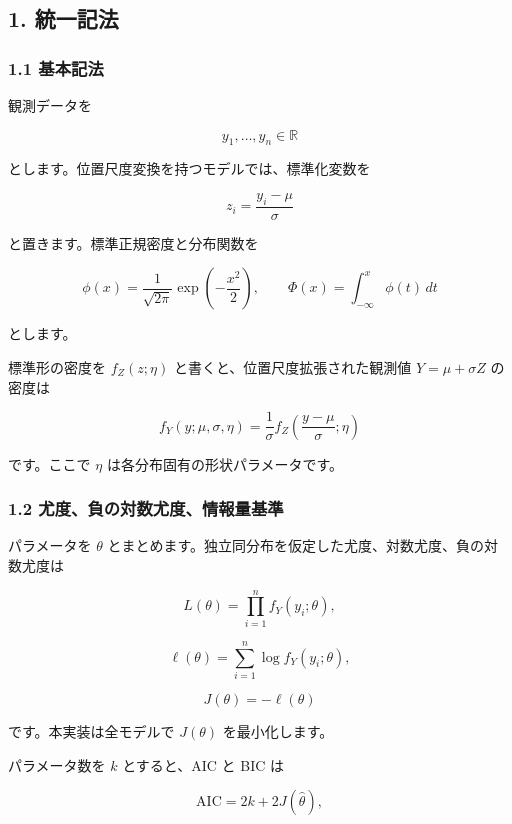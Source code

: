 \documentclass[
]{article}
\begin{document}
\hypertarget{ux7d71ux4e00ux8a18ux6cd5}{%
\subsection{1. 統一記法}\label{ux7d71ux4e00ux8a18ux6cd5}}

\hypertarget{ux57faux672cux8a18ux6cd5}{%
\subsubsection{1.1 基本記法}\label{ux57faux672cux8a18ux6cd5}}

観測データを

\[
y_1,\ldots,y_n \in \mathbb{R}
\]

とします。位置尺度変換を持つモデルでは、標準化変数を

\[
z_i = \frac{y_i - \mu}{\sigma}
\]

と置きます。標準正規密度と分布関数を

\[
\phi(x)=\frac{1}{\sqrt{2\pi}}\exp\left(-\frac{x^2}{2}\right),
\qquad
\Phi(x)=\int_{-\infty}^{x}\phi(t)\,dt
\]

とします。

標準形の密度を \(f_Z(z;\eta)\) と書くと、位置尺度拡張された観測値
\(Y=\mu+\sigma Z\) の密度は

\[
f_Y(y;\mu,\sigma,\eta)
=\frac{1}{\sigma} f_Z\left(\frac{y-\mu}{\sigma};\eta\right)
\]

です。ここで \(\eta\) は各分布固有の形状パラメータです。

\hypertarget{ux5c24ux5ea6ux8ca0ux306eux5bfeux6570ux5c24ux5ea6ux60c5ux5831ux91cfux57faux6e96}{%
\subsubsection{1.2
尤度、負の対数尤度、情報量基準}\label{ux5c24ux5ea6ux8ca0ux306eux5bfeux6570ux5c24ux5ea6ux60c5ux5831ux91cfux57faux6e96}}

パラメータを \(\theta\)
とまとめます。独立同分布を仮定した尤度、対数尤度、負の対数尤度は

\[
L(\theta)=\prod_{i=1}^n f_Y(y_i;\theta),
\]

\[
\ell(\theta)=\sum_{i=1}^{n}\log f_Y(y_i;\theta),
\]

\[
J(\theta)=-\ell(\theta)
\]

です。本実装は全モデルで \(J(\theta)\) を最小化します。

パラメータ数を \(k\) とすると、AIC と BIC は

\[
\mathrm{AIC}=2k+2J(\hat\theta),
\]
\end{document}
